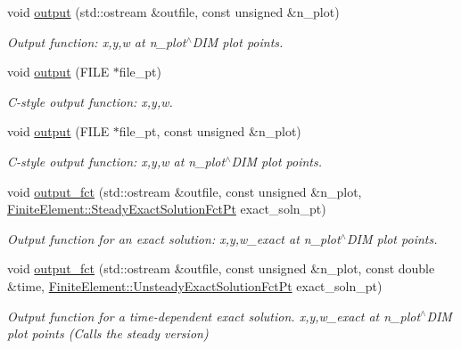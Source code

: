 \begin{DoxyCompactItemize}
void \hyperlink{classoomph_1_1QFoepplvonKarmanElement_a7cf9bdcf7294233f27d8fc6c87ac7bbe}{output} (std\+::ostream \&outfile, const unsigned \&n\+\_\+plot)
\begin{DoxyCompactList}\small\item\em Output function\+: x,y,w at n\+\_\+plot$^\wedge$\+D\+IM plot points. \end{DoxyCompactList}\item 
void \hyperlink{classoomph_1_1QFoepplvonKarmanElement_a8ac6c9196e21b2848e1519f572a0e24e}{output} (F\+I\+LE $\ast$file\+\_\+pt)
\begin{DoxyCompactList}\small\item\em C-\/style output function\+: x,y,w. \end{DoxyCompactList}\item 
void \hyperlink{classoomph_1_1QFoepplvonKarmanElement_a06a3e1ea84c4177bc32c819b5aa0f01e}{output} (F\+I\+LE $\ast$file\+\_\+pt, const unsigned \&n\+\_\+plot)
\begin{DoxyCompactList}\small\item\em C-\/style output function\+: x,y,w at n\+\_\+plot$^\wedge$\+D\+IM plot points. \end{DoxyCompactList}\item 
void \hyperlink{classoomph_1_1QFoepplvonKarmanElement_a8bfd0ab0a5a7726f154deec3bde0a22b}{output\+\_\+fct} (std\+::ostream \&outfile, const unsigned \&n\+\_\+plot, \hyperlink{classoomph_1_1FiniteElement_a690fd33af26cc3e84f39bba6d5a85202}{Finite\+Element\+::\+Steady\+Exact\+Solution\+Fct\+Pt} exact\+\_\+soln\+\_\+pt)
\begin{DoxyCompactList}\small\item\em Output function for an exact solution\+: x,y,w\+\_\+exact at n\+\_\+plot$^\wedge$\+D\+IM plot points. \end{DoxyCompactList}\item 
void \hyperlink{classoomph_1_1QFoepplvonKarmanElement_aaf40f9b3c63ec3e5feebccaedbe7d012}{output\+\_\+fct} (std\+::ostream \&outfile, const unsigned \&n\+\_\+plot, const double \&time, \hyperlink{classoomph_1_1FiniteElement_ad4ecf2b61b158a4b4d351a60d23c633e}{Finite\+Element\+::\+Unsteady\+Exact\+Solution\+Fct\+Pt} exact\+\_\+soln\+\_\+pt)
\begin{DoxyCompactList}\small\item\em Output function for a time-\/dependent exact solution. x,y,w\+\_\+exact at n\+\_\+plot$^\wedge$\+D\+IM plot points (Calls the steady version) \end{DoxyCompactList}\end{DoxyCompactItemize}
